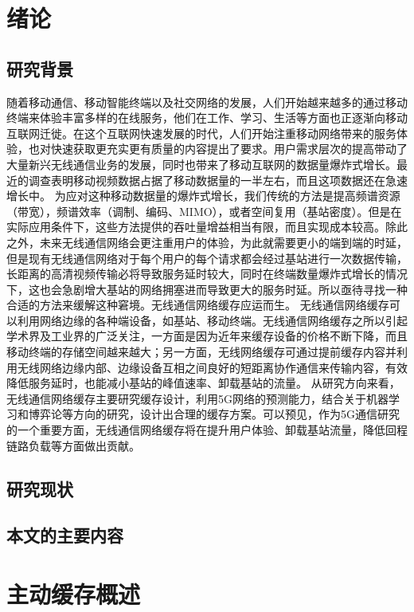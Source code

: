 \documentclass[bachelor]{seuthesis} %
\begin{document}
\begin{Main} %

\chapter{绪论}
\section{研究背景}
随着移动通信、移动智能终端以及社交网络的发展，人们开始越来越多的通过移动终端来体验丰富多样的在线服务，他们在工作、学习、生活等方面也正逐渐向移动互联网迁徙。在这个互联网快速发展的时代，人们开始注重移动网络带来的服务体验，也对快速获取更充实更有质量的内容提出了要求。用户需求层次的提高带动了大量新兴无线通信业务的发展，同时也带来了移动互联网的数据量爆炸式增长。最近的调查表明移动视频数据占据了移动数据量的一半左右，而且这项数据还在急速增长中。
为应对这种移动数据量的爆炸式增长，我们传统的方法是提高频谱资源（带宽），频谱效率（调制、编码、MIMO），或者空间复用（基站密度）。但是在实际应用条件下，这些方法提供的吞吐量增益相当有限，而且实现成本较高。除此之外，未来无线通信网络会更注重用户的体验，为此就需要更小的端到端的时延，但是现有无线通信网络对于每个用户的每个请求都会经过基站进行一次数据传输，长距离的高清视频传输必将导致服务延时较大，同时在终端数量爆炸式增长的情况下，这也会急剧增大基站的网络拥塞进而导致更大的服务时延。所以亟待寻找一种合适的方法来缓解这种窘境。无线通信网络缓存应运而生。
无线通信网络缓存可以利用网络边缘的各种端设备，如基站、移动终端。无线通信网络缓存之所以引起学术界及工业界的广泛关注，一方面是因为近年来缓存设备的价格不断下降，而且移动终端的存储空间越来越大；另一方面，无线网络缓存可通过提前缓存内容并利用无线网络边缘内部、边缘设备互相之间良好的短距离协作通信来传输内容，有效降低服务延时，也能减小基站的峰值速率、卸载基站的流量。
从研究方向来看，无线通信网络缓存主要研究缓存设计，利用5G网络的预测能力，结合关于机器学习和博弈论等方向的研究，设计出合理的缓存方案。可以预见，作为5G通信研究的一个重要方面，无线通信网络缓存将在提升用户体验、卸载基站流量，降低回程链路负载等方面做出贡献。
\section{研究现状}

\section{本文的主要内容}


\chapter{主动缓存概述}

\end{Main}
\end{document}
